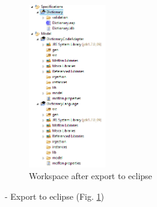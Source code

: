\begin{figure}[!htbp]
\begin{center}
 \includegraphics[width=0.3\textwidth]{pics/moca/1DictionaryMetaModel/6-ExportToEclipse}
  \caption{Workspace after export to eclipse}
  \label{moca-6-ExportToEclipse}
\end{center}
\end{figure}

- Export to eclipse  (Fig. \ref{moca-6-ExportToEclipse})
